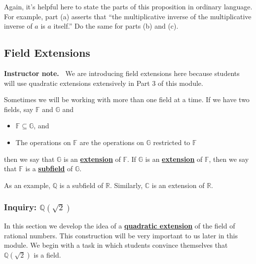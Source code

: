\documentclass[11pt]{article}
\newenvironment{bignote}[1][Instructor note]%
	{\begin{mdframed}\raggedright{\bf #1.~}}
	{\end{mdframed}}
\newenvironment{task}
	{\begin{mdframed}[linecolor=lightgray, linewidth=3pt]\raggedright}
	{\end{mdframed}}
\renewcommand\emph[1]{\underline{\bf{#1}}} %
\theoremstyle{definition}
\begin{document}
\begin{task}
Again, it's helpful here to state the parts of this proposition in ordinary language. For example, part (a) asserts that ``the multiplicative inverse of
the multiplicative inverse of $a$ is $a$ itself.'' Do the same for parts (b) and (c).
\end{task}

\subsection{Field Extensions}

\begin{bignote}
 We are introducing field extensions here because students will use quadratic extensions extensively in Part 3 of this module. 
\end{bignote}

Sometimes we will be working with more than one field at a time. If we have two fields, say $\mathbb{F}$ and $\mathbb{G}$ and
\begin{itemize}
  \item $\mathbb{F}\subseteq \mathbb{G}$, and
  \item The operations on $\mathbb{F}$ are the operations on $\mathbb{G}$ restricted to $\mathbb{F}$
\end{itemize}
then we say that $\mathbb{G}$ is an \emph{extension} of $\mathbb{F}$. If $\mathbb{G}$ is an \emph{extension} of $\mathbb{F}$, then we say that
$\mathbb{F}$ is a \emph{subfield} of $\mathbb{G}$.

As an example, $\mathbb{Q}$ is a subfield of $\mathbb{R}$. Similarly, $\mathbb{C}$ is an extension of $\mathbb{R}$.

\subsubsection{Inquiry: $\mathbb{Q}(\sqrt{2})$}

In this section we develop the idea of a \emph{quadratic extension} of the field of rational numbers. This construction will be very important to us
later in this module. We begin with a task in which students convince themselves that $\mathbb{Q}(\sqrt{2})$ is a field.
\end{document}

